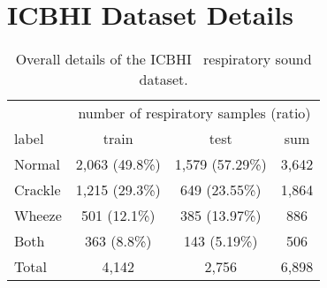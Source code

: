 \documentclass{article}
\begin{document}
\section{ICBHI Dataset Details}
\label{appendix_icbhi}
\begin{table}[!ht]
    \centering
    \caption{Overall details of the ICBHI~\cite{rocha2018alpha} respiratory sound dataset.}
\label{app_tab:tab1}
    \addtolength{\tabcolsep}{10pt}
    \footnotesize{
\begin{tabular}{l|cc|c}
    \toprule
    & \multicolumn{3}{c}{number of respiratory samples (ratio)} \\
    \cmidrule(l{2pt}r{2pt}){2-4}
    label & train & test & sum \\
    \hline 
    \midrule
    Normal & 2,063 (49.8\%) & 1,579 (57.29\%) & 3,642 \\
    Crackle & 1,215 (29.3\%) & 649 (23.55\%) & 1,864 \\
    Wheeze & 501 (12.1\%) & 385 (13.97\%) & 886 \\
    Both & 363 (8.8\%) & 143 (5.19\%) & 506 \\
    \midrule
    Total & 4,142 & 2,756 & 6,898 \\
    \bottomrule
    \end{tabular}}
\end{table} \begin{table}[!ht]
    \centering
    \caption{Overall details of Mixed-ICBHI dataset with synthetic and real samples.}
\label{app_tab:tab2}
    \addtolength{\tabcolsep}{10pt}
\end{table}
\end{document}
